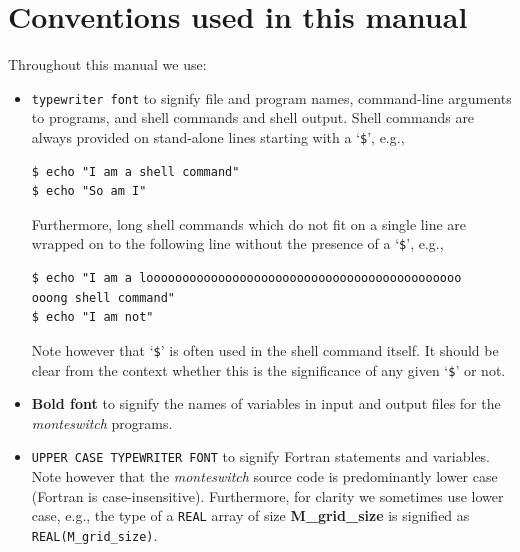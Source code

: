 \documentclass{report}
\begin{document}
\chapter*{Conventions used in this manual}
Throughout this manual we use:
\begin{itemize}
\item \texttt{typewriter font} to signify file and program names, command-line arguments to programs, and shell
commands and shell output. Shell commands are always provided on stand-alone lines starting with a `\verb|$|', e.g.,
\begin{verbatim}
$ echo "I am a shell command"
$ echo "So am I"
\end{verbatim}
Furthermore, long shell commands which do not fit on a single line are wrapped on to the following line without the presence of
a `\verb|$|', e.g.,
\begin{verbatim}
$ echo "I am a loooooooooooooooooooooooooooooooooooooooooooo
ooong shell command"
$ echo "I am not"
\end{verbatim}
Note however that `\verb|$|' is often used in the shell command itself. It should be clear from the context whether this is the
significance of any given `\verb|$|' or not.
\item \textbf{Bold font} to signify the names of variables in input and output files for the \emph{monteswitch} programs.
\item \texttt{UPPER CASE TYPEWRITER FONT} to signify Fortran statements and variables. Note however that the \emph{monteswitch} 
source code is predominantly lower case (Fortran is case-insensitive). Furthermore, for clarity we sometimes use lower case, e.g.,
the type of a \texttt{REAL} array of size \textbf{M\_grid\_size} is signified as \texttt{REAL(M\_grid\_size)}.
\end{itemize}


\end{document}
